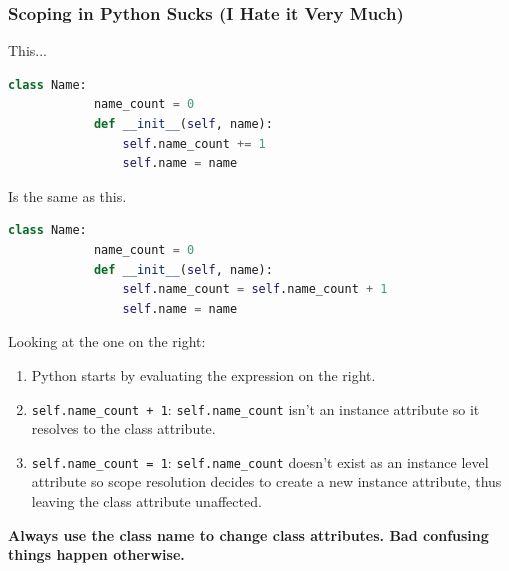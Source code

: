 \documentclass{beamer}
\begin{document}
%
%
%
\begin{frame}[fragile]
    \frametitle{Scoping in Python Sucks (I Hate it Very Much)}
    \begin{minipage}{0.47\textwidth}
        This...
        \begin{lstlisting}[language=Python, autogobble, basicstyle=\tiny]
        class Name:
            name_count = 0
            def __init__(self, name):
                self.name_count += 1
                self.name = name
        \end{lstlisting}
    \end{minipage}
    \hfill
    \begin{minipage}{0.52\textwidth}
        Is the same as this.
        \begin{lstlisting}[language=Python, autogobble, basicstyle=\tiny]
        class Name:
            name_count = 0
            def __init__(self, name):
                self.name_count = self.name_count + 1
                self.name = name
        \end{lstlisting}
    \end{minipage}
    \vfill
    \pause
    Looking at the one on the right:
    \begin{enumerate}
        \item Python starts by evaluating the expression on the right.
            \pause
        \item \lstinline|self.name_count + 1|:  \lstinline|self.name_count| isn't an instance attribute so it resolves to the class attribute.
            \pause
        \item \lstinline|self.name_count = 1|: \lstinline|self.name_count| doesn't exist as an instance level attribute so scope resolution decides to create a new instance attribute, thus leaving the class attribute unaffected.
    \end{enumerate}
    \pause
    \textbf{Always use the class name to change class attributes. Bad confusing things happen otherwise.}
\end{frame}
\end{document}
